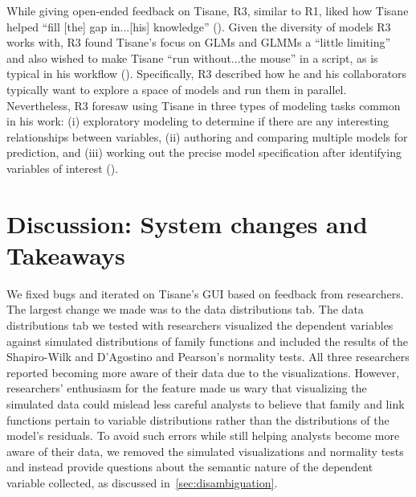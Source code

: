 While giving open-ended feedback on Tisane, R3, similar to R1, liked how Tisane helped ``fill
[the] gap in...[his] knowledge'' (\rqCognitive). Given the diversity of models
R3 works with, R3 found Tisane's focus on GLMs and GLMMs a ``little limiting'' and also
wished to make Tisane ``run without...the mouse'' in a script, as is typical in
his workflow (\rqWorkflow). Specifically, R3 described how he and his
collaborators typically want to explore a space of models and run them in
parallel. Nevertheless, R3 foresaw using Tisane in three types of modeling tasks
common in his work: (i) exploratory modeling to determine if there are any
interesting relationships between variables, (ii) authoring and comparing
multiple models for prediction, and (iii) working out the precise model
specification after identifying variables of interest (\rqFuture).

\section{Discussion: System changes and Takeaways}

We fixed bugs and iterated on Tisane's GUI based on feedback from
researchers. The largest change we made was to the data distributions tab. The data distributions
tab we tested with researchers visualized the dependent variables
against simulated distributions of family functions and included the results of the Shapiro-Wilk and D'Agostino and Pearson's normality tests. All three researchers
reported becoming more aware of their data due to the visualizations. However, researchers' enthusiasm for the feature made us wary that visualizing the simulated data 
could mislead less careful analysts to believe that family and link functions pertain to variable
distributions rather than the distributions of the model's residuals. 
To avoid
such errors while still helping analysts become more aware of their data, we
removed the simulated visualizations and normality tests and instead provide questions about the semantic nature of the dependent variable
collected, as discussed in~\autoref{sec:disambiguation}.

